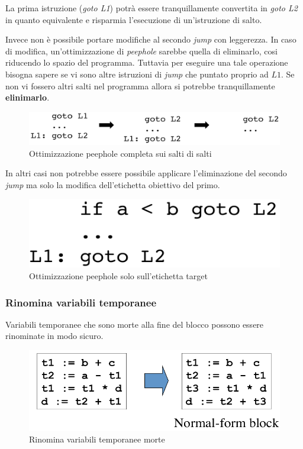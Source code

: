 La prima istruzione (\textit{goto L1}) potr\`a essere tranquillamente
convertita in \textit{goto L2} in quanto equivalente e risparmia l'esecuzione
di un'istruzione di salto.

Invece non \`e possibile portare modifiche al secondo \textit{jump} con
leggerezza. In caso di modifica, un'ottimizzazione di \textit{peephole} sarebbe
quella di eliminarlo, cosi riducendo lo spazio del programma. Tuttavia per
eseguire una tale operazione bisogna sapere se vi sono altre istruzioni di
\textit{jump} che puntato proprio ad $L1$. Se non vi fossero altri salti
nel programma allora si potrebbe tranquillamente \textbf{elinimarlo}.
\begin{figure}[H]
  \centering
  \includegraphics[scale=0.4]{res/image/remove_jump_jump}
  \caption{Ottimizzazione peephole completa sui salti di salti}
  \label{img:remove_jump_jump}
\end{figure}

In altri casi non potrebbe essere possibile applicare l'eliminazione del
secondo \textit{jump} ma solo la modifica dell'etichetta obiettivo del primo.
\begin{figure}[H]
  \centering
  \includegraphics[scale=0.4]{res/image/no_remove_jump_jump}
  \caption{Ottimizzazione peephole solo sull'etichetta target}
  \label{img:no_remove_jump_jump}
\end{figure}

\subsubsection{Rinomina variabili temporanee}
\label{sec:renaming_temporary_variable}
Variabili temporanee che sono morte alla fine del blocco possono essere
rinominate in modo sicuro.
\begin{figure}[H]
  \centering
  \includegraphics[scale=0.4]{res/image/renaming_variable}
  \caption{Rinomina variabili temporanee morte}
  \label{img:renaming_variable}
\end{figure}


